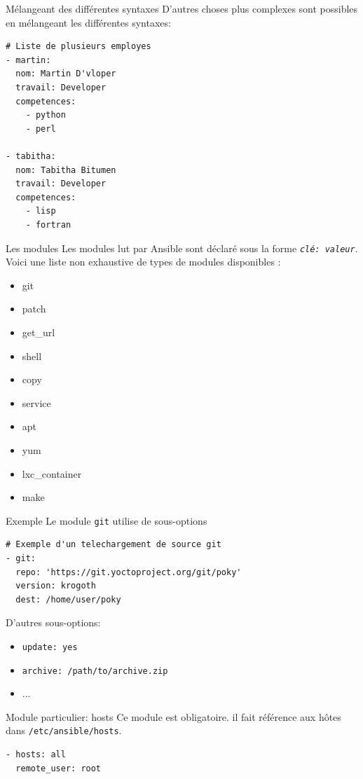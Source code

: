 \documentclass[compress]{smilebeamer}
\begin{document}
\begin{frame}[fragile]{Mélangeant des différentes syntaxes}
D’autres choses plus complexes sont possibles en mélangeant les différentes syntaxes:
\begin{lstlisting}[style=bitbake]
# Liste de plusieurs employes
- martin:
  nom: Martin D'vloper
  travail: Developer
  competences:
    - python
    - perl

- tabitha:
  nom: Tabitha Bitumen
  travail: Developer
  competences:
    - lisp
    - fortran
\end{lstlisting}
\end{frame}


\begin{frame}[fragile]{Les modules}
Les modules lut par Ansible sont déclaré sous la forme \textit{\texttt{clé: valeur}}.\newline
Voici une liste non exhaustive de types de modules disponibles :
\begin{itemize}
	\item git
	\item patch
	\item get\_url
	\item shell
	\item copy
	\item service
	\item apt
	\item yum
	\item lxc\_container
	\item make
\end{itemize}
\end{frame}


\begin{frame}[fragile]{Exemple}
Le module \texttt{git} utilise de sous-options
\begin{lstlisting}[style=bitbake]
# Exemple d'un telechargement de source git
- git:
  repo: 'https://git.yoctoproject.org/git/poky'
  version: krogoth
  dest: /home/user/poky
\end{lstlisting}
D'autres sous-options:
\begin{itemize}
	\item \texttt{update: yes}
	\item \texttt{archive: /path/to/archive.zip}
	\item ...
\end{itemize}
\end{frame}

\begin{frame}[fragile]{Module particulier: hosts}
Ce module est obligatoire.\newline
il fait référence aux hôtes dans \texttt{/etc/ansible/hosts}.
\begin{lstlisting}[style=bitbake]
- hosts: all
  remote_user: root
\end{lstlisting}
\end{frame}
\end{document}
